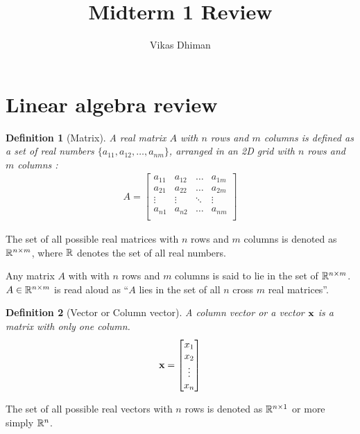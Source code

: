 \documentclass[twocolumn]{article}
\title{Midterm 1  Review}
\author{Vikas  Dhiman}
\newtheorem{defn}{Definition}
\begin{document}
\maketitle

\tableofcontents
\section{Linear algebra   review}
\begin{defn}[Matrix] A  real  matrix  $A$ with $n$ rows  and  $m$  columns is defined as a  set  of real numbers  $\{a_{11}, a_{12},
\dots,     a_{nm}\}$, arranged in
an 2D grid with $n$  rows  and $m$  columns :
\begin{align}
  A  =  \begin{bmatrix}
    a_{11}  &  a_{12} &   \dots &  a_{1m} \\
    a_{21}  &  a_{22} &   \dots &  a_{2m} \\
    \vdots  & \vdots &   \ddots  &  \vdots   \\
    a_{n1}  &  a_{n2} &   \dots &  a_{nm} \\
    \end{bmatrix}
\end{align}
\end{defn}

The set of all possible real  matrices with  $n$ rows   and   $m$  columns  is
denoted  as $\mathbb{R}^{n \times   m}$, where  $\mathbb{R}$ denotes  the set  of all real numbers.

Any matrix $A$ with with  $n$  rows  and  $m$  columns  is   said  to lie  in
the  set  of $\mathbb{R}^{n \times   m}$. $A \in \mathbb{R}^{n \times m}$  is  read aloud
as ``$A$  lies  in   the set of all $n$ cross $m$  real matrices''.

\begin{defn}[Vector  or Column vector]
  A column vector or a vector $\mathbf{x}$ is a matrix  with only one column.
  \begin{align}
    \mathbf{x}  =  \begin{bmatrix}
      x_{1} \\
      x_{2} \\
      \vdots   \\
      x_{n} \\
    \end{bmatrix}
  \end{align}
\end{defn}

The set of all possible real  vectors with  $n$ rows   is
denoted  as $\mathbb{R}^{n \times   1}$ or more simply $\mathbb{R}^{n}$.
\end{document}
